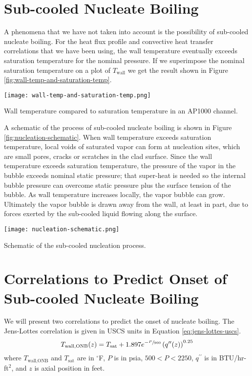 \section{Sub-cooled Nucleate Boiling}
A phenomena that we have not taken into account is the possibility of sub-cooled nucleate boiling.  For the heat flux profile and convective heat transfer correlations that we have been using, the wall temperature eventually exceeds saturation temperature for the nominal pressure. If we superimpose the nominal saturation temperature on a plot of $T_{\text{wall}}$ we get the result shown in Figure \ref{fig:wall-temp-and-saturation-temp}.
\begin{marginfigure}
\texttt{[image: wall-temp-and-saturation-temp.png]}
\caption{Wall temperature compared to saturation temperature in an AP1000 channel.}
\label{fig:wall-temp-and-saturation-temp}
\end{marginfigure}
A schematic of the process of sub-cooled nucleate boiling is shown in Figure \ref{fig:nucleation-schematic}.  When wall temperature exceeds saturation temperature, local voids of saturated vapor can form at nucleation sites, which are small pores, cracks or scratches in the clad surface.  Since the wall temperature exceeds saturation temperature, the pressure of the vapor in the bubble exceeds nominal static pressure; that super-heat is needed so the internal bubble pressure can overcome static pressure plus the surface tension of the bubble.  As wall temperature increases locally, the vapor bubble can grow.  Ultimately the vapor bubble is drawn away from the wall, at least in part, due to forces exerted by the sub-cooled liquid flowing along the surface.
\begin{marginfigure}
\texttt{[image: nucleation-schematic.png]}
\caption{Schematic of the sub-cooled nucleation process.}
\label{fig:nucleation-schematic}
\end{marginfigure}

\section{Correlations to Predict Onset of Sub-cooled Nucleate Boiling}
We will present two correlations to predict the onset of nucleate boiling.  The Jens-Lottes correlation is given in USCS units in Equation \ref{eq:jens-lottes-uscs}. 
\begin{equation}
T_{\text{wall,ONB}}(z) = T_{\text{sat}}+1.897e^{-\sfrac{P}{900}}\left(q^{\prime \prime}(z) \right)^{0.25}
\label{eq:jens-lottes-uscs}
\end{equation}
where $T_{\text{wall,ONB}}$ and $T_{\text{sat}}$ are in $^{\circ}$F, $P$ is in psia, $500 < P < 2250$, $q^{\prime \prime}$ is in BTU/hr-ft$^{2}$, and $z$ is axial position in feet.

